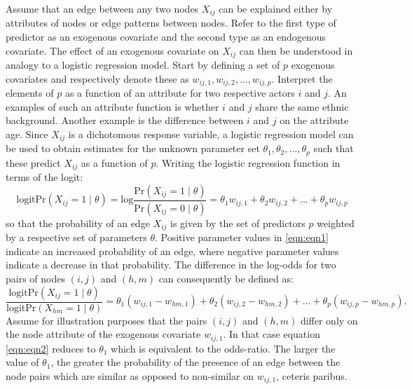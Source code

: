 \documentclass[a4paper, man, floatsintext]{apa6}
\begin{document}
Assume that an edge between any two nodes $X_{ij}$ can be explained either by attributes of nodes or edge patterns between nodes. Refer to the first type of predictor as an exogenous covariate and the second type as an endogenous covariate. The effect of an exogenous covariate on $X_{ij}$ can then be understood in analogy to a logistic regression model. Start by defining a set of $p$ exogenous covariates and respectively denote these as $w_{ij,1}, w_{ij,2}, ..., w_{ij,p}$. Interpret the elements of $p$ as a function of an attribute for two respective actors $i$ and $j$. An examples of such an attribute function is whether $i$ and $j$ share the same ethnic background. Another example is the difference between $i$ and $j$ on the attribute age. Since $X_{ij}$ is a dichotomous response variable, a logistic regression model can be used to obtain estimates for the unknown parameter set $\theta_{1}, \theta_{2}, ..., \theta_{p}$ such that these predict $X_{ij}$ as a function of $p$. Writing the logistic regression function in terms of the logit: \begin{equation} \label{eqn:eqn1} \text{logitPr}(X_{ij} = 1 \mid \theta) = \text{log}\frac{\text{Pr}(X_{ij} = 1 \mid \theta)}{\text{Pr}(X_{ij} = 0 \mid \theta)} = \theta_{1}w_{ij,1} + \theta_{2}w_{ij,2} + ... + \theta_{p}w_{ij, p} \end{equation} so that the probability of an edge $X_{ij}$ is given by the set of  predictors $p$ weighted by a respective set of parameters $\theta$. Positive parameter values in \eqref{eqn:eqn1} indicate an increased probability of an edge, where negative parameter values indicate a decrease in that probability. The difference in the log-odds for two pairs of nodes $(i, j)$ and $(h, m)$ can consequently be defined as: \begin{equation} \label{eqn:eqn2} \frac{\text{logitPr}(X_{ij} = 1 \mid \theta)}{\text{logitPr}(X_{hm} = 1 \mid \theta)} = \theta_{1}(w_{ij,1} - w_{hm,1}) + \theta_{2}(w_{ij,2} - w_{hm,2}) + ... + \theta_{p}(w_{ij, p} - w_{hm, p}).\end{equation} \clearpage \noindent Assume for illustration purposes that the pairs $(i, j)$ and $(h, m)$ differ only on the node attribute of the exogenous covariate $w_{ij,1}$. In that case equation \eqref{eqn:eqn2} reduces to $\theta_{1}$ which is equivalent to the odds-ratio. The larger the value of $\theta_{1}$, the greater the probability of the presence of an edge between the node pairs which are similar as opposed to non-similar on $w_{ij, 1}$, ceteris paribus.
\\
\end{document}
